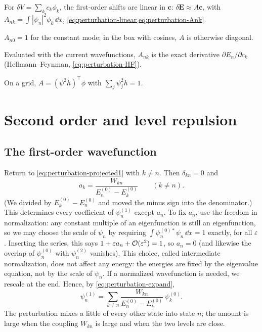 \begin{keyideas}
\item For $\delta V=\sum_kc_k\phi_k$, the first-order shifts are linear in $\bm c$: $\delta\bm E\approx A\bm c$, with $A_{nk}=\int|\psi_n|^2\phi_k\,\dd x$, \cref{eq:perturbation-linear,eq:perturbation-Ank}.
\item $A_{n0}=1$ for the constant mode; in the box with cosines, $A$ is otherwise diagonal.
\item Evaluated with the current wavefunctions, $A_{nk}$ is the exact derivative $\partial E_n/\partial c_k$ (Hellmann--Feynman, \cref{eq:perturbation-HF}).
\item On a grid, $A=(\psi^2h)^{\top}\phi$ with $\sum_j\psi_j^2h=1$.
\end{keyideas}

\section{Second order and level repulsion}\label{sec:perturbation-second}

\subsection{The first-order wavefunction}

Return to \cref{eq:perturbation-projected1} with $k\ne n$. Then $\delta_{kn}=0$ and
\begin{equation}
a_k=\frac{W_{kn}}{E_n^{(0)}-E_k^{(0)}}\qquad(k\ne n).
\label{eq:perturbation-ak-result}
\end{equation}
(We divided by $E_k^{(0)}-E_n^{(0)}$ and moved the minus sign into the denominator.) This determines every coefficient of $\psi_n^{(1)}$ except $a_n$. To fix $a_n$, use the freedom in normalization: any constant multiple of an eigenfunction is still an eigenfunction, so we may choose the scale of $\psi_n$ by requiring $\int\psi_n^{(0)*}\psi_n\,\dd x=1$ exactly, for all $\varepsilon$. Inserting the series, this says $1+\varepsilon a_n+\mathcal{O}(\varepsilon^2)=1$, so $a_n=0$ (and likewise the overlap of $\psi_n^{(0)}$ with $\psi_n^{(2)}$ vanishes). This choice, called intermediate normalization, does not affect any energy: the energies are fixed by the eigenvalue equation, not by the scale of $\psi_n$. If a normalized wavefunction is needed, we rescale at the end. Hence, by \cref{eq:perturbation-expand},
\begin{equation}
\psi_n^{(1)}=\sum_{k\ne n}\frac{W_{kn}}{E_n^{(0)}-E_k^{(0)}}\,\psi_k^{(0)} .
\label{eq:perturbation-psi1}
\end{equation}
The perturbation mixes a little of every other state into state $n$; the amount is large when the coupling $W_{kn}$ is large and when the two levels are close.

